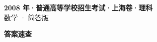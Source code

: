 \documentclass[zihao=-4, a4paper]{ctexart}
\begin{document}
\begin{center}
  {\Large\bfseries 2008 年·普通高等学校招生考试·上海卷·理科}\\[4pt]
  {\large 数学 · 简答版}
\end{center}
\medskip
{}

\clearpage
{}
\begin{center}{\Large\bfseries 答案速查}\end{center}
\medskip

\end{document}
